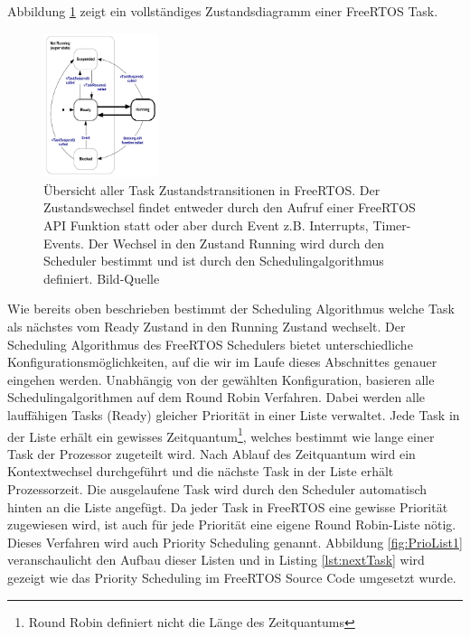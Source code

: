  Abbildung \ref{fig:TaskStates} zeigt ein vollständiges Zustandsdiagramm einer FreeRTOS Task. 
\begin{figure}[ht!]
	\centering
		\includegraphics[width=0.3\textwidth]{Pictures/FreeRTOSOrg/taskStates.png}
	\caption{Übersicht aller Task Zustandstransitionen in FreeRTOS. Der Zustandswechsel findet entweder durch den Aufruf einer FreeRTOS API Funktion statt oder aber durch Event z.B. Interrupts, Timer-Events. Der Wechsel in den Zustand Running wird durch den Scheduler bestimmt und ist durch den Schedulingalgorithmus definiert.  Bild-Quelle~\protect{}}
	\label{fig:TaskStates}
\end{figure}Wie bereits oben beschrieben bestimmt der Scheduling Algorithmus welche Task als nächstes vom Ready Zustand in den Running Zustand wechselt. Der Scheduling Algorithmus des FreeRTOS Schedulers bietet unterschiedliche Kon\-fi\-gu\-ra\-tions\-mög\-lich\-kei\-ten, auf die wir im Laufe dieses Abschnittes genauer eingehen werden. Unabhängig von der gewählten Konfiguration, basieren alle Schedulingalgorithmen auf dem Round Robin Verfahren\cite{9783827373427}. Dabei werden alle lauf\-fäh\-igen Tasks (Ready) gleicher Priorität in einer Liste verwaltet. Jede Task in der Liste erhält ein gewisses Zeitquantum\footnote{Round Robin definiert nicht die Länge des Zeitquantums}, welches bestimmt wie lange einer Task der Prozessor zugeteilt wird. Nach Ablauf des Zeitquantum wird ein Kontextwechsel durchgeführt und die näch\-ste Task in der Liste erhält Prozessorzeit. Die ausgelaufene Task wird durch den Scheduler automatisch hinten an die Liste angefügt. Da jeder Task in FreeRTOS eine gewisse Priorität zugewiesen wird, ist auch für jede Priorität eine eigene Round Robin-Liste nötig. Dieses Verfahren wird auch Priority Scheduling \cite{9783827373427} genannt. Abbildung \ref{fig:PrioList1} veranschaulicht den Aufbau dieser Listen und in Listing \ref{lst:nextTask} wird gezeigt wie das Priority Scheduling im FreeRTOS Source Code umgesetzt wurde. 
